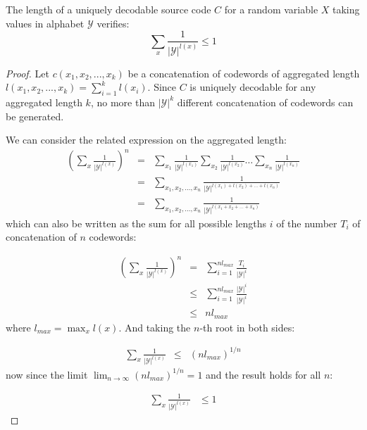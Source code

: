 \begin{theorem} The length of a uniquely decodable source code $C$ for a random variable ${X}$ taking values in alphabet $\mathcal{Y}$ verifies:
\begin{equation*}
\sum_{x}\frac{1}{|\mathcal{Y}|^{l(x)}} \leq 1
\end{equation*}
\label{th:mcmillan}
\end{theorem}
\begin{proof}
Let $c(x_1, x_2, ..., x_k)$ be a concatenation of codewords of aggregated length $l(x_1, x_2, ..., x_k)=\sum_{i=1}^k l(x_i)$. Since $C$ is uniquely decodable for any aggregated length $k$, no more than $|\mathcal{Y}|^k$ different concatenation of codewords can be generated. 

We can consider the related expression on the aggregated length:
\begin{eqnarray}
\left( \sum_{x}\frac{1}{|\mathcal{Y}|^{l(x)}} \right)^n &=& \sum_{x_1}\frac{1}{|\mathcal{Y}|^{l(x_1)}} \sum_{x_2}\frac{1}{|\mathcal{Y}|^{l(x_2)}} \dots \sum_{x_n }\frac{1}{|\mathcal{Y}|^{l(x_n)}} \nonumber \\
&=& \sum_{x_1,x_2,\dots,x_n }\frac{1}{|\mathcal{Y}|^{l(x_1)+l(x_2)+\dots +l(x_n)}} \nonumber \\
&=& \sum_{x_1,x_2,\dots,x_n }\frac{1}{|\mathcal{Y}|^{l(x_1+x_2+\dots +x_n)}}
\end{eqnarray}
\noindent which can also be written as the sum for all possible lengths $i$ of the number $T_i$ of concatenation of $n$ codewords:

\begin{eqnarray}
\left( \sum_{x }\frac{1}{|\mathcal{Y}|^{l(x)}} \right)^n &=& \sum_{i=1}^{nl_{max}}\frac{T_i}{|\mathcal{Y}|^i} \nonumber \\
&\leq & \sum_{i=1}^{nl_{max}}\frac{|\mathcal{Y}|^i}{|\mathcal{Y}|^i} \nonumber \\
&\leq & nl_{max}
\end{eqnarray}
\noindent where $l_{max} = \max_{x}l(x)$. And taking the $n$-th root in both sides:

\begin{eqnarray}
\sum_{x }\frac{1}{|\mathcal{Y}|^{l(x)}}  &\leq & (nl_{max})^{1/n}
\end{eqnarray}
\noindent now since the limit $\lim_{n \to \infty } (nl_{max})^{1/n} = 1$ and the result holds for all $n$:

\begin{eqnarray}
\sum_{x }\frac{1}{|\mathcal{Y}|^{l(x)}}  &\leq 1
\end{eqnarray}
\end{proof}

